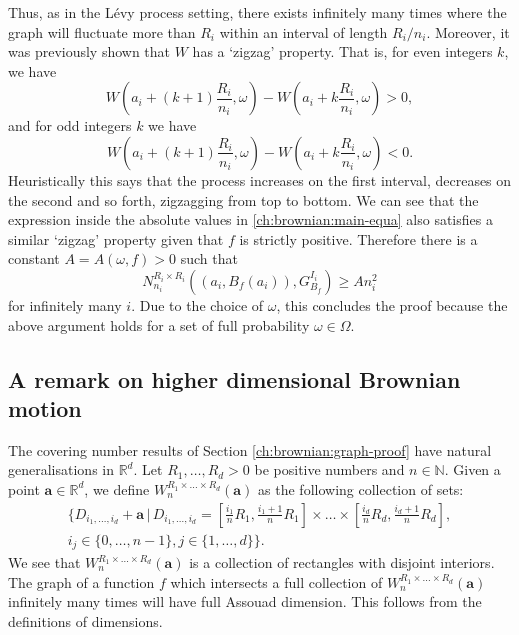 	Thus, as in the L\'evy process setting, there exists infinitely many times where the graph will fluctuate more than $R_i$ within an interval of length $R_i/n_i$. Moreover, it was previously shown that $W$ has a `zigzag' property. That is, for even integers $k$, we have
	\[
	W\left(a_i+(k+1)\frac{R_i}{n_i},\omega\right)-W\left(a_i+k\frac{R_i}{n_i},\omega\right)>0,
	\] 
	and for odd integers $k$ we have
	\[
	W\left(a_i+(k+1)\frac{R_i}{n_i},\omega\right)-W\left(a_i+k\frac{R_i}{n_i},\omega\right)<0.
	\]  
	Heuristically this says that the process increases on the first interval, decreases on the second and so forth, zigzagging from top to bottom. We can see that the expression inside the absolute values in \eqref{ch:brownian:main-equa} also satisfies a similar `zigzag' property given that $f$ is strictly positive. Therefore there is a constant $A=A(\omega,f)>0$ such that
	\[
	N_{n_i}^{R_i\times R_i} \left( (a_i, B_f(a_i)), G_{B_f}^{I_i} \right) \ge  A n_i^2
	\] 
	for infinitely many $i$. Due to the choice of $\omega$, this concludes the proof because the above argument holds for a set of full probability $\omega\in\Omega$.





\subsection{A remark on higher dimensional Brownian motion}\label{ch-brownian:sec:higher-dim}

The covering number results of Section \ref{ch:brownian:graph-proof} have natural generalisations in $\mathbb{R}^d$. Let $R_1,\dots,R_d>0$ be positive numbers and $n\in \mathbb{N}$. Given a point $\mathbf{a}\in\mathbb{R}^d$, we define $W_{n}^{R_1\times\dots\times R_d}(\mathbf{a})$ as the following collection of sets:
\begin{eqnarray*}
	\Bigg\{D_{i_1,\dots,i_d}+\mathbf{a} \, \vert \, D_{i_1,\dots,i_d}=\left[\frac{i_1}{n}R_1,\frac{i_1+1}{n}R_1\right]\times\dots\times \left[\frac{i_d}{n}R_d,\frac{i_d+1}{n}R_d\right],\\ i_j\in\{0,\dots,n-1\}, j\in\{1,\dots,d\}\Bigg\}.
\end{eqnarray*}
We see that $W_{n}^{R_1\times\dots\times R_d}(\mathbf{a})$ is a collection of rectangles with disjoint interiors. The graph of a function $f$ which intersects a full collection of $W_{n}^{R_1\times\dots\times R_d}(\mathbf{a})$ infinitely many times will have full Assouad dimension. This follows from the definitions of dimensions.

